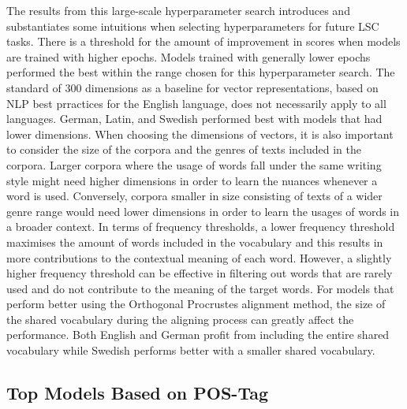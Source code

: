 The results from this large-scale hyperparameter search introduces and substantiates some intuitions when selecting hyperparameters for future LSC tasks. There is a threshold for the amount of improvement in scores when models are trained with higher epochs. Models trained with generally lower epochs performed the best within the range chosen for this hyperparameter search. The standard of 300 dimensions as a baseline for vector representations, based on NLP best prractices for the English language, does not necessarily apply to all languages. German, Latin, and Swedish performed best with models that had lower dimensions. When choosing the dimensions of vectors, it is also important to consider the size of the corpora and the genres of texts included in the corpora. Larger corpora where the usage of words fall under the same writing style might need higher dimensions in order to learn the nuances whenever a word is used. Conversely, corpora smaller in size consisting of texts of a wider genre range would need lower dimensions in order to learn the usages of words in a broader context. In terms of frequency thresholds, a lower frequency threshold maximises the amount of words included in the vocabulary and this results in more contributions to the contextual meaning of each word. However, a slightly higher frequency threshold can be effective in filtering out words that are rarely used and do not contribute to the meaning of the target words. For models that perform better using the Orthogonal Procrustes alignment method, the size of the shared vocabulary during the aligning process can greatly affect the performance. Both English and German profit from including the entire shared vocabulary while Swedish performs better with a smaller shared vocabulary.

\subsection{Top Models Based on POS-Tag}

